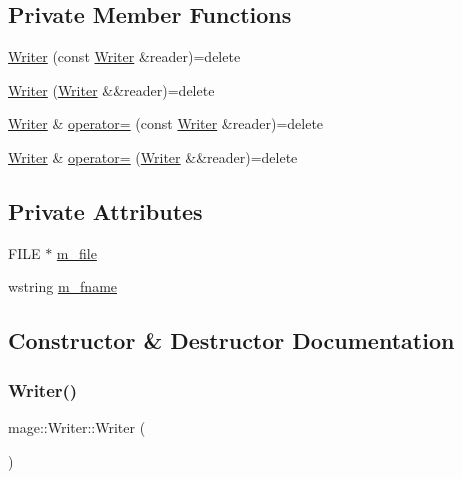 \subsection*{Private Member Functions}
\begin{DoxyCompactItemize}
\item 
\hyperlink{classmage_1_1_writer_a0988d427f687ad5334c2ba74993e0d6e}{Writer} (const \hyperlink{classmage_1_1_writer}{Writer} \&reader)=delete
\item 
\hyperlink{classmage_1_1_writer_a2c8169d5fd5a5b00bf587440f2c88b7c}{Writer} (\hyperlink{classmage_1_1_writer}{Writer} \&\&reader)=delete
\item 
\hyperlink{classmage_1_1_writer}{Writer} \& \hyperlink{classmage_1_1_writer_a14fff6d050ad263bd351b26b86ca4186}{operator=} (const \hyperlink{classmage_1_1_writer}{Writer} \&reader)=delete
\item 
\hyperlink{classmage_1_1_writer}{Writer} \& \hyperlink{classmage_1_1_writer_aacbdb763abf79c5753b89bd336f56ea3}{operator=} (\hyperlink{classmage_1_1_writer}{Writer} \&\&reader)=delete
\end{DoxyCompactItemize}
\subsection*{Private Attributes}
\begin{DoxyCompactItemize}
\item 
F\+I\+LE $\ast$ \hyperlink{classmage_1_1_writer_a04428b72245b50d45c62cbd23c2f039a}{m\+\_\+file}
\item 
wstring \hyperlink{classmage_1_1_writer_afa271ee47897d4961e9d62132d8faeb5}{m\+\_\+fname}
\end{DoxyCompactItemize}


\subsection{Constructor \& Destructor Documentation}
\hypertarget{classmage_1_1_writer_a40b6cd3005d509e670c5a49272d9ef27}{}\label{classmage_1_1_writer_a40b6cd3005d509e670c5a49272d9ef27} 
\subsubsection{\texorpdfstring{Writer()}{Writer()}\hspace{0.1cm}{\footnotesize\ttfamily [1/3]}}
{\footnotesize\ttfamily mage\+::\+Writer\+::\+Writer (\begin{DoxyParamCaption}{ }\end{DoxyParamCaption})}

